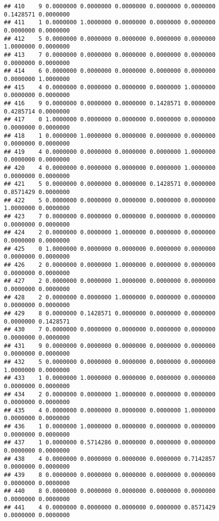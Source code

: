 \documentclass[
]{article}
\begin{document}
\begin{verbatim}
## 410    9 0.0000000 0.0000000 0.0000000 0.0000000 0.0000000 0.1428571 0.0000000
## 411    1 0.0000000 1.0000000 0.0000000 0.0000000 0.0000000 0.0000000 0.0000000
## 412    5 0.0000000 0.0000000 0.0000000 0.0000000 0.0000000 1.0000000 0.0000000
## 413    7 0.0000000 0.0000000 0.0000000 0.0000000 0.0000000 0.0000000 0.0000000
## 414    6 0.0000000 0.0000000 0.0000000 0.0000000 0.0000000 0.0000000 1.0000000
## 415    4 0.0000000 0.0000000 0.0000000 0.0000000 1.0000000 0.0000000 0.0000000
## 416    9 0.0000000 0.0000000 0.0000000 0.1428571 0.0000000 0.4285714 0.0000000
## 417    0 1.0000000 0.0000000 0.0000000 0.0000000 0.0000000 0.0000000 0.0000000
## 418    1 0.0000000 1.0000000 0.0000000 0.0000000 0.0000000 0.0000000 0.0000000
## 419    4 0.0000000 0.0000000 0.0000000 0.0000000 1.0000000 0.0000000 0.0000000
## 420    4 0.0000000 0.0000000 0.0000000 0.0000000 1.0000000 0.0000000 0.0000000
## 421    5 0.0000000 0.0000000 0.0000000 0.1428571 0.0000000 0.8571429 0.0000000
## 422    5 0.0000000 0.0000000 0.0000000 0.0000000 0.0000000 1.0000000 0.0000000
## 423    7 0.0000000 0.0000000 0.0000000 0.0000000 0.0000000 0.0000000 0.0000000
## 424    2 0.0000000 0.0000000 1.0000000 0.0000000 0.0000000 0.0000000 0.0000000
## 425    0 1.0000000 0.0000000 0.0000000 0.0000000 0.0000000 0.0000000 0.0000000
## 426    2 0.0000000 0.0000000 1.0000000 0.0000000 0.0000000 0.0000000 0.0000000
## 427    2 0.0000000 0.0000000 1.0000000 0.0000000 0.0000000 0.0000000 0.0000000
## 428    2 0.0000000 0.0000000 1.0000000 0.0000000 0.0000000 0.0000000 0.0000000
## 429    8 0.0000000 0.1428571 0.0000000 0.0000000 0.0000000 0.0000000 0.1428571
## 430    7 0.0000000 0.0000000 0.0000000 0.0000000 0.0000000 0.0000000 0.0000000
## 431    9 0.0000000 0.0000000 0.0000000 0.0000000 0.0000000 0.0000000 0.0000000
## 432    5 0.0000000 0.0000000 0.0000000 0.0000000 0.0000000 1.0000000 0.0000000
## 433    1 0.0000000 1.0000000 0.0000000 0.0000000 0.0000000 0.0000000 0.0000000
## 434    2 0.0000000 0.0000000 1.0000000 0.0000000 0.0000000 0.0000000 0.0000000
## 435    4 0.0000000 0.0000000 0.0000000 0.0000000 1.0000000 0.0000000 0.0000000
## 436    1 0.0000000 1.0000000 0.0000000 0.0000000 0.0000000 0.0000000 0.0000000
## 437    1 0.0000000 0.5714286 0.0000000 0.0000000 0.0000000 0.0000000 0.0000000
## 438    4 0.0000000 0.0000000 0.0000000 0.0000000 0.7142857 0.0000000 0.0000000
## 439    8 0.0000000 0.0000000 0.0000000 0.0000000 0.0000000 0.0000000 0.0000000
## 440    8 0.0000000 0.0000000 0.0000000 0.0000000 0.0000000 0.0000000 0.0000000
## 441    4 0.0000000 0.0000000 0.0000000 0.0000000 0.8571429 0.0000000 0.0000000

\end{verbatim}
\end{document}
